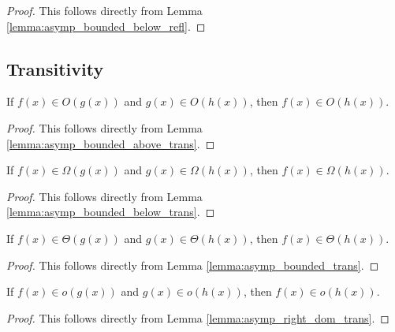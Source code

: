 \begin{proof}
    \leanok
    This follows directly from Lemma \ref{lemma:asymp_bounded_below_refl}.
\end{proof}


\subsection{Transitivity}

\begin{lemma}
    \label{lemma:O_trans}
    \leanok
    If $f(x) \in O(g(x))$ and $g(x) \in O(h(x))$, then $f(x) \in O(h(x))$.
\end{lemma}

\begin{proof}
    \leanok
    This follows directly from Lemma \ref{lemma:asymp_bounded_above_trans}.
\end{proof}

\begin{lemma}
    \label{lemma:Omega_trans}
    \leanok
    If $f(x) \in \Omega(g(x))$ and $g(x) \in \Omega(h(x))$, then $f(x) \in \Omega(h(x))$.
\end{lemma}

\begin{proof}
    \leanok
    This follows directly from Lemma \ref{lemma:asymp_bounded_below_trans}.
\end{proof}

\begin{lemma}
    \label{lemma:theta_trans}
    \leanok
    If $f(x) \in \Theta(g(x))$ and $g(x) \in \Theta(h(x))$, then $f(x) \in \Theta(h(x))$.
\end{lemma}

\begin{proof}
    \leanok
    This follows directly from Lemma \ref{lemma:asymp_bounded_trans}.
\end{proof}

\begin{lemma}
    \label{lemma:o_trans}
    \leanok
    If $f(x) \in o(g(x))$ and $g(x) \in o(h(x))$, then $f(x) \in o(h(x))$. 
\end{lemma}

\begin{proof}
    \leanok
    This follows directly from Lemma \ref{lemma:asymp_right_dom_trans}.
\end{proof}

